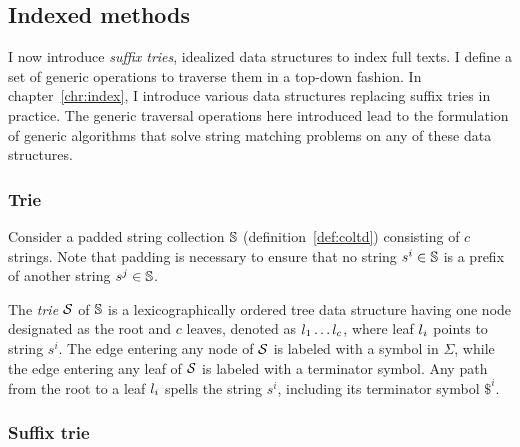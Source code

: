 


\subsection{Indexed methods}
\label{sub:introindex}

I now introduce \emph{suffix tries}, idealized data structures to index full texts.
I define a set of generic operations to traverse them in a top-down fashion.
In chapter~\ref{chr:index}, I introduce various data structures replacing suffix tries in practice.
The generic traversal operations here introduced lead to the formulation of generic algorithms that solve string matching problems on any of these data structures.

\subsubsection{Trie}

Consider a padded string collection $\mathbb {S}$ (definition~\ref{def:coltd}) consisting of $c$ strings.
Note that padding is necessary to ensure that no string $s^i \in \mathbb {S}$ is a prefix of another string $s^j \in \mathbb {S}$.
\begin{definition}
The \emph{trie} $\mathcal {S}$ of $\mathbb {S}$ is a lexicographically ordered tree data structure having one node designated as the root and $c$ leaves, denoted as $l_1 \dots l_c$, where leaf $l_i$ points to string $s^i$.
The edge entering any node of $\mathcal {S}$ is labeled with a symbol in $\Sigma$, while the edge entering any leaf of $\mathcal {S}$ is labeled with a terminator symbol.
Any path from the root to a leaf $l_i$ spells the string $s^i$, including its terminator symbol $\$^i$.
\end{definition}

\subsubsection{Suffix trie}

